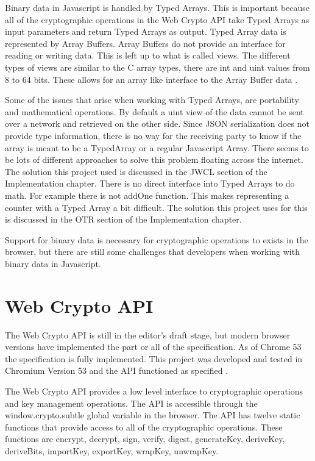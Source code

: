 Binary data in Javascript is handled by Typed Arrays. This is important because all of the cryptographic operations in the Web Crypto API take Typed Arrays as input parameters and return Typed Arrays as output. Typed Array data is represented by Array Buffers. Array Buffers do not provide an interface for reading or writing data. This is left up to what is called views. The different types of views are similar to the C array types, there are int and uint values from 8 to 64 bits. These allows for an array like interface to the Array Buffer data \cite{mdn-typedarrays}.


Some of the issues that arise when working with Typed Arrays, are portability and mathematical operations. By default a uint view of the data cannot be sent over a network and retrieved on the other side. Since JSON serialization does not provide type information, there is no way for the receiving party to know if the array is meant to be a TypedArray or a regular Javascript Array. There seems to be lots of different approaches to solve this problem floating across the internet. The solution this project used is discussed in the JWCL section of the Implementation chapter. There is no direct interface into Typed Arrays to do math. For example there is not addOne function. This makes representing a counter with a Typed Array a bit difficult. The solution this project uses for this is discussed in the OTR section of the Implementation chapter.


Support for binary data is necessary for cryptographic operations to exists in the browser, but there are still some challenges that developers when working with binary data in Javascript.


\section{Web Crypto API}


The Web Crypto API is still in the editor's draft stage, but modern browser versions have implemented the part or all of the specification. As of Chrome 53 the specification is fully implemented. This project was developed and tested in Chromium Version 53 and the API functioned as specified \cite{webcrypto-overview}\cite{webcrypto-chromium}.


The Web Crypto API provides a low level interface to cryptographic operations and key management operations. The API is accessible through the window.crypto.subtle global variable in the browser. The API has twelve static functions that provide access to all of the cryptographic operations. These functions are encrypt, decrypt, sign, verify, digest, generateKey, deriveKey, deriveBits, importKey, exportKey, wrapKey, unwrapKey.



